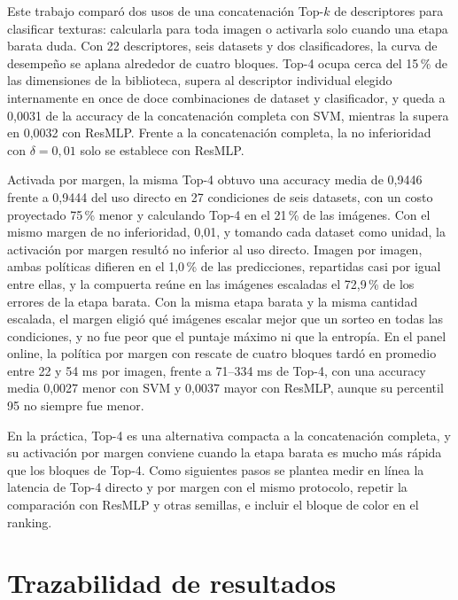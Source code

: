 \documentclass[a4paper,fleqn]{cas-sc}
\begin{document}
Este trabajo comparó dos usos de una concatenación Top-$k$ de descriptores para clasificar texturas: calcularla para toda imagen o activarla solo cuando una etapa barata duda. Con 22 descriptores, seis datasets y dos clasificadores, la curva de desempeño se aplana alrededor de cuatro bloques. Top-4 ocupa cerca del 15\,\% de las dimensiones de la biblioteca, supera al descriptor individual elegido internamente en once de doce combinaciones de dataset y clasificador, y queda a 0,0031 de la accuracy de la concatenación completa con SVM, mientras la supera en 0,0032 con ResMLP. Frente a la concatenación completa, la no inferioridad con $\delta=0{,}01$ solo se establece con ResMLP.

Activada por margen, la misma Top-4 obtuvo una accuracy media de 0,9446 frente a 0,9444 del uso directo en 27 condiciones de seis datasets, con un costo proyectado 75\,\% menor y calculando Top-4 en el 21\,\% de las imágenes. Con el mismo margen de no inferioridad, 0,01, y tomando cada dataset como unidad, la activación por margen resultó no inferior al uso directo. Imagen por imagen, ambas políticas difieren en el 1,0\,\% de las predicciones, repartidas casi por igual entre ellas, y la compuerta reúne en las imágenes escaladas el 72,9\,\% de los errores de la etapa barata. Con la misma etapa barata y la misma cantidad escalada, el margen eligió qué imágenes escalar mejor que un sorteo en todas las condiciones, y no fue peor que el puntaje máximo ni que la entropía. En el panel online, la política por margen con rescate de cuatro bloques tardó en promedio entre 22 y 54 ms por imagen, frente a 71--334 ms de Top-4, con una accuracy media 0,0027 menor con SVM y 0,0037 mayor con ResMLP, aunque su percentil 95 no siempre fue menor.

En la práctica, Top-4 es una alternativa compacta a la concatenación completa, y su activación por margen conviene cuando la etapa barata es mucho más rápida que los bloques de Top-4. Como siguientes pasos se plantea medir en línea la latencia de Top-4 directo y por margen con el mismo protocolo, repetir la comparación con ResMLP y otras semillas, e incluir el bloque de color en el ranking.

\clearpage
\appendix
\section{Trazabilidad de resultados}\label{app:reproducibilidad}
\end{document}
